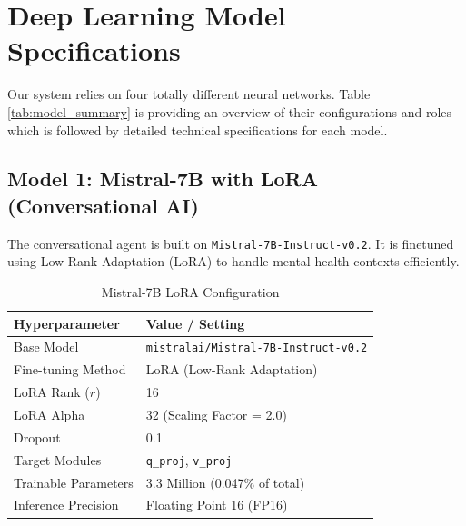\section{Deep Learning Model Specifications}
Our system relies on four totally different neural networks. Table \ref{tab:model_summary} is providing an overview of their configurations and roles  which is followed by detailed technical specifications for each model.

\begin{table}[H]
\centering
\renewcommand{\arraystretch}{1.3}
\caption{Summary of AI Model Configurations}
\label{tab:model_summary}
\end{table}

\subsection{Model 1: Mistral-7B with LoRA (Conversational AI)}
The conversational agent is built on \texttt{Mistral-7B-Instruct-v0.2}. It is finetuned using Low-Rank Adaptation (LoRA) to handle mental health contexts efficiently.

\begin{table}[H]
\centering
\renewcommand{\arraystretch}{1.2}
\begin{tabular}{|l|l|}
\hline
\rowcolor{gray!15} \textbf{Hyperparameter} & \textbf{Value / Setting} \\ \hline
Base Model & \texttt{mistralai/Mistral-7B-Instruct-v0.2} \\ \hline
Fine-tuning Method & LoRA (Low-Rank Adaptation) \\ \hline
LoRA Rank ($r$) & 16 \\ \hline
LoRA Alpha & 32 (Scaling Factor = 2.0) \\ \hline
Dropout & 0.1 \\ \hline
Target Modules & \texttt{q\_proj}, \texttt{v\_proj} \\ \hline
Trainable Parameters & 3.3 Million (0.047\% of total) \\ \hline
Inference Precision & Floating Point 16 (FP16) \\ \hline
\end{tabular}
\caption{Mistral-7B LoRA Configuration}
\label{tab:mistral_config}
\end{table}

